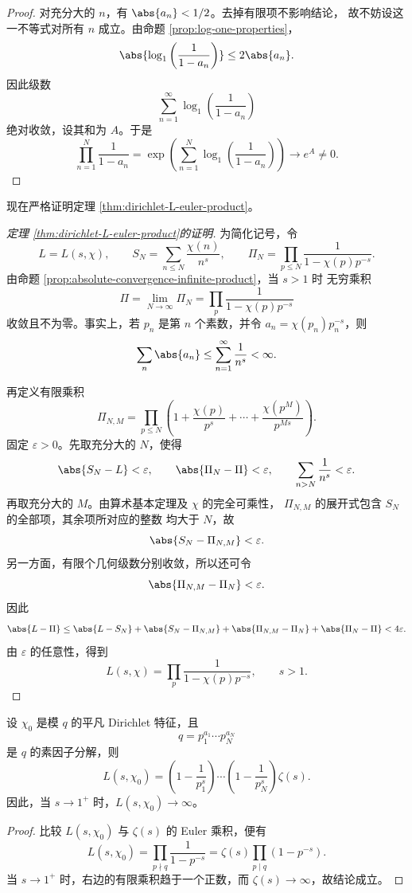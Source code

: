 \begin{proof}
	对充分大的 $n$，有 $\abs{a_n}<1/2$。去掉有限项不影响结论，
	故不妨设这一不等式对所有 $n$ 成立。由命题
	\ref{prop:log-one-properties}，
	\[
	\abs{\log_1\left(\frac1{1-a_n}\right)}
	\leq2\abs{a_n}.
	\]
	因此级数
	\[
	\sum_{n=1}^{\infty}
	\log_1\left(\frac1{1-a_n}\right)
	\]
	绝对收敛，设其和为 $A$。于是
	\[
	\prod_{n=1}^{N}\frac1{1-a_n}
	=\exp\left(
	\sum_{n=1}^{N}\log_1\left(\frac1{1-a_n}\right)
	\right)
	\longrightarrow e^A\neq0.
	\]
\end{proof}

现在严格证明定理 \ref{thm:dirichlet-L-euler-product}。

\begin{proof}[定理 \ref{thm:dirichlet-L-euler-product}的证明]
为简化记号，令
\[
L=L(s,\chi),
\qquad
S_N=\sum_{n\leq N}\frac{\chi(n)}{n^s},
\qquad
\Pi_N=\prod_{p\leq N}\frac1{1-\chi(p)p^{-s}}.
\]
由命题 \ref{prop:absolute-convergence-infinite-product}，当 $s>1$ 时
无穷乘积
\[
\Pi=\lim_{N\to\infty}\Pi_N
=\prod_p\frac1{1-\chi(p)p^{-s}}
\]
收敛且不为零。事实上，若 $p_n$ 是第 $n$ 个素数，并令
$a_n=\chi(p_n)p_n^{-s}$，则
\[
\sum_n\abs{a_n}\leq\sum_{n=1}^{\infty}\frac1{n^s}<\infty.
\]

再定义有限乘积
\[
\Pi_{N,M}
=\prod_{p\leq N}
\left(1+\frac{\chi(p)}{p^s}+\cdots
+\frac{\chi(p^M)}{p^{Ms}}\right).
\]
固定 $\varepsilon>0$。先取充分大的 $N$，使得
\[
\abs{S_N-L}<\varepsilon,
\qquad
\abs{\Pi_N-\Pi}<\varepsilon,
\qquad
\sum_{n>N}\frac1{n^s}<\varepsilon.
\]
再取充分大的 $M$。由算术基本定理及 $\chi$ 的完全可乘性，
$\Pi_{N,M}$ 的展开式包含 $S_N$ 的全部项，其余项所对应的整数
均大于 $N$，故
\[
\abs{S_N-\Pi_{N,M}}<\varepsilon.
\]
另一方面，有限个几何级数分别收敛，所以还可令
\[
\abs{\Pi_{N,M}-\Pi_N}<\varepsilon.
\]
因此
\[
\abs{L-\Pi}
\leq\abs{L-S_N}
+\abs{S_N-\Pi_{N,M}}
+\abs{\Pi_{N,M}-\Pi_N}
+\abs{\Pi_N-\Pi}
<4\varepsilon.
\]
由 $\varepsilon$ 的任意性，得到
\[
L(s,\chi)=\prod_p\frac1{1-\chi(p)p^{-s}},
\qquad s>1.
\]
\end{proof}
\newpage
\begin{proposition}\label{prop:principal-character-L-function}
	设 $\chi_0$ 是模 $q$ 的平凡 Dirichlet 特征，且
	\[
	q=p_1^{a_1}\cdots p_N^{a_N}
	\]
	是 $q$ 的素因子分解，则
	\[
	L(s,\chi_0)
	=\left(1-\frac1{p_1^s}\right)
	\cdots
	\left(1-\frac1{p_N^s}\right)\zeta(s).
	\]
	因此，当 $s\to1^+$ 时，$L(s,\chi_0)\to\infty$。
\end{proposition}

\begin{proof}
	比较 $L(s,\chi_0)$ 与 $\zeta(s)$ 的 Euler 乘积，便有
	\[
	L(s,\chi_0)
	=\prod_{p\nmid q}\frac1{1-p^{-s}}
	=\zeta(s)\prod_{p\mid q}(1-p^{-s}).
	\]
	当 $s\to1^+$ 时，右边的有限乘积趋于一个正数，而
	$\zeta(s)\to\infty$，故结论成立。
\end{proof}

